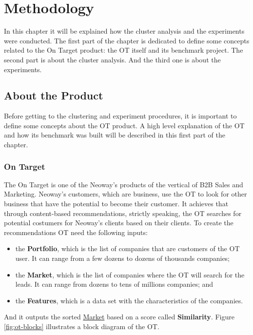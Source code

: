 \chapter{Methodology}
\label{ch:methodology}

In this chapter it will be explained how the cluster analysis and the experiments were conducted. The first part of the chapter is dedicated to define some concepts related to the On Target product: the OT itself and its benchmark project. The second part is about the cluster analysis. And the third one is about the experiments.

\section{About the Product}

Before getting to the clustering and experiment procedures, it is important to define some concepts about the OT product. A high level explanation of the OT and how its benchmark was built will be described in this first part of the chapter.

\subsection{On Target}

The On Target is one of the Neoway's products of the vertical of B2B Sales and Marketing. Neoway's customers, which are business, use the OT to look for other business that have the potential to become their customer. It achieves that through content-based recommendations, strictly speaking, the OT searches for potential costumers for Neoway's clients based on their clients. To create the recommendations OT need the following inputs:
\begin{itemize}
    \item the \textbf{Portfolio}, which is the list of companies that are customers of the OT user. It can range from a few dozens to dozens of thousands companies;
    \item the \textbf{Market}, which is the list of companies where the OT will search for the leads. It can range from dozens to tens of millions companies; and
    \item the \textbf{Features}, which is a data set with the characteristics of the companies.
\end{itemize}
And it outputs the sorted \underline{Market} based on a score called \textbf{Similarity}. Figure \ref{fig:ot-blocks} illustrates a block diagram of the OT.

